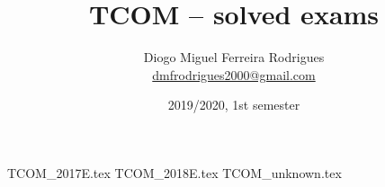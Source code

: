 \documentclass{tcom}
\title{TCOM -- solved exams}
\author{Diogo Miguel Ferreira Rodrigues \\ \href{mailto:dmfrodrigues2000@gmail.com}{dmfrodrigues2000@gmail.com}}
\date{2019/2020, 1st semester}
\begin{document}
\maketitle
\tableofcontents
{TCOM_2017E.tex}
{TCOM_2018E.tex}
{TCOM_unknown.tex}
\end{document}
